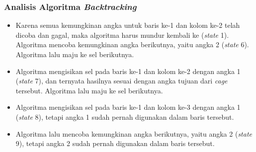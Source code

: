 \documentclass{beamer}
\begin{document}
\begin{frame}
\frametitle{Analisis Algoritma \textit{Backtracking}}
\begin{itemize}
\item Karena semua kemungkinan angka untuk baris ke-1 dan kolom ke-2 telah dicoba dan gagal, maka algoritma harus mundur kembali ke (\textit{state} 1). Algoritma mencoba kemungkinan angka berikutnya, yaitu angka 2 (\textit{state} 6). Algoritma lalu maju ke sel berikutnya.
\item Algoritma mengisikan sel pada baris ke-1 dan kolom ke-2 dengan angka 1 (\textit{state} 7), dan ternyata hasilnya sesuai dengan angka tujuan dari \textit{cage} tersebut. Algoritma lalu maju ke sel berikutnya.
\item Algoritma mengisikan sel pada baris ke-1 dan kolom ke-3 dengan angka 1 (\textit{state} 8), tetapi angka 1 sudah pernah digunakan dalam baris tersebut.
\item Algoritma lalu mencoba kemungkinan angka berikutnya, yaitu angka 2 (\textit{state} 9), tetapi angka 2 sudah pernah digunakan dalam baris tersebut.
\end{itemize}
\end{frame}

\end{document}
